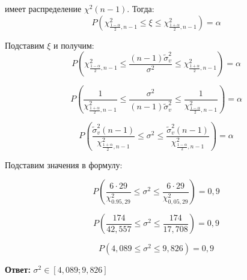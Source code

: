 \documentclass[]{article}
\begin{document}
	имеет распределение $\chi^2(n-1)$. Тогда:\\
	
 $$P \left(  \chi^2_{\frac{1-\alpha}{2},n-1}  \leqslant \xi \leqslant\chi^2_{\frac{1+\alpha}{2},n-1}\right) =\alpha$$
 
 	Подставим $\xi$ и получим:\\
 	
	 $$P \left(  \chi^2_{\frac{1-\alpha}{2},n-1}  \leqslant \frac{(n-1) \tilde{\sigma}^2_v}{\sigma^2} \leqslant\chi^2_{\frac{1+\alpha}{2},n-1}\right) =\alpha$$
	 
	 $$P \left( \frac{1}{\chi^2_{\frac{1+\alpha}{2},n-1}}  \leqslant \frac{\sigma^2}{(n-1)\tilde{\sigma}^2_v} \leqslant \frac{1}{\chi^2_{\frac{1-\alpha}{2},n-1}}\right) =\alpha$$	
	 	
	 $$P \left( \frac{\tilde{\sigma}^2_v(n-1)}{\chi^2_{\frac{1+\alpha}{2},n-1}}  \leqslant \sigma^2 \leqslant \frac{\tilde{\sigma}^2_v(n-1)}{\chi^2_{\frac{1-\alpha}{2},n-1}}\right) =\alpha$$	
	 
	 \vspace{10pt}
	 
	 Подставим значения в формулу:
	 
	 $$P \left( \frac{6 \cdot 29}{\chi^2_{0.95,29}}  \leqslant \sigma^2 \leqslant \frac{6 \cdot 29}{\chi^2_{0,05,29}}\right) =0,9$$	
	 
	 $$P \left( \frac{174}{42,557}  \leqslant \sigma^2 \leqslant \frac{174}{17,708}\right) =0,9$$	
	 
	 $$P \left( 4,089 \leqslant \sigma^2 \leqslant 9,826\right) =0,9$$	
	 
	 \textbf{Ответ:} $\sigma^2 \in \left[ 4,089 ; 9,826\right]$ 
	
	
\end{document}
